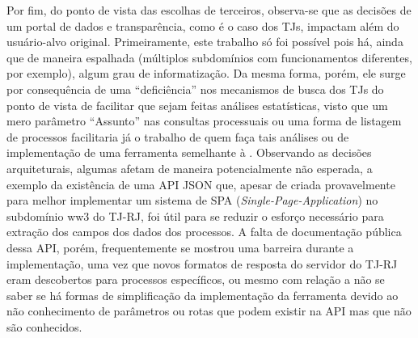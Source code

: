 Por fim, do ponto de vista das escolhas de terceiros, observa-se que as
decisões de um portal de dados e transparência, como é o caso dos TJs, impactam
além do usuário-alvo original. Primeiramente, este trabalho só foi possível
pois há, ainda que de maneira espalhada (múltiplos subdomínios com
funcionamentos diferentes, por exemplo), algum grau de informatização.
 Da mesma forma, porém, ele surge por consequência de uma
``deficiência'' nos mecanismos de busca dos TJs do ponto de vista de facilitar
que sejam feitas análises estatísticas, visto que um mero parâmetro ``Assunto''
nas consultas processuais ou uma forma de listagem de processos facilitaria já
o trabalho de quem faça tais análises ou de implementação de uma ferramenta
semelhante à \tjscraper. Observando as decisões arquiteturais, algumas afetam
de maneira potencialmente não esperada, a exemplo da existência de uma API JSON
que, apesar de criada provavelmente para melhor implementar um sistema de SPA
(\textit{Single-Page-Application}) no subdomínio ww3 do TJ-RJ, foi útil para se
reduzir o esforço necessário para extração dos campos dos dados dos processos.
A falta de documentação pública dessa API, porém, frequentemente se mostrou uma
barreira durante a implementação, uma vez que novos formatos de resposta do
servidor do TJ-RJ eram descobertos para processos específicos, ou mesmo com
relação a não se saber se há formas de simplificação da implementação da
ferramenta devido ao não conhecimento de parâmetros ou rotas que podem existir
na API mas que não são conhecidos.
